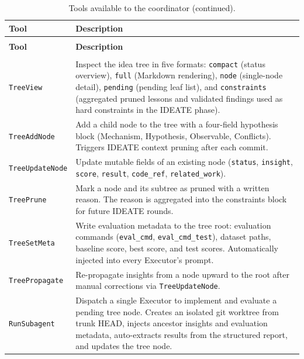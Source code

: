 \begingroup
\footnotesize
\setlength{\tabcolsep}{3pt}
\renewcommand{\arraystretch}{1.02}
\setlength{\LTpre}{4pt}
\setlength{\LTpost}{6pt}
\begin{xltabular}{\linewidth}{>{\raggedright\arraybackslash}p{3.8cm}>{\raggedright\arraybackslash}X}
\caption{Tools available to the coordinator.}
\label{tab:meta-agent-tools}\\
\toprule
\textbf{Tool} & \textbf{Description} \\
\midrule
\endfirsthead
\caption[]{Tools available to the coordinator (continued).}\\
\toprule
\textbf{Tool} & \textbf{Description} \\
\midrule
\endhead
\midrule
{}\\
\endfoot
\bottomrule
\endlastfoot
\texttt{TreeView} & Inspect the idea tree in five formats: \texttt{compact} (status overview), \texttt{full} (Markdown rendering), \texttt{node} (single-node detail), \texttt{pending} (pending leaf list), and \texttt{constraints} (aggregated pruned lessons and validated findings used as hard constraints in the IDEATE phase). \\
\texttt{TreeAddNode} & Add a child node to the tree with a four-field hypothesis block (Mechanism, Hypothesis, Observable, Conflicts). Triggers IDEATE context pruning after each commit. \\
\texttt{TreeUpdateNode} & Update mutable fields of an existing node (\texttt{status}, \texttt{insight}, \texttt{score}, \texttt{result}, \texttt{code\_ref}, \texttt{related\_work}). \\
\texttt{TreePrune} & Mark a node and its subtree as pruned with a written reason. The reason is aggregated into the constraints block for future IDEATE rounds. \\
\texttt{TreeSetMeta} & Write evaluation metadata to the tree root: evaluation commands (\texttt{eval\_cmd}, \texttt{eval\_cmd\_test}), dataset paths, baseline score, best score, and test scores. Automatically injected into every Executor's prompt. \\
\texttt{TreePropagate} & Re-propagate insights from a node upward to the root after manual corrections via \texttt{TreeUpdateNode}. \\
\texttt{RunSubagent} & Dispatch a single Executor to implement and evaluate a pending tree node. Creates an isolated git worktree from trunk HEAD, injects ancestor insights and evaluation metadata, auto-extracts results from the structured report, and updates the tree node. \\

\end{xltabular}
